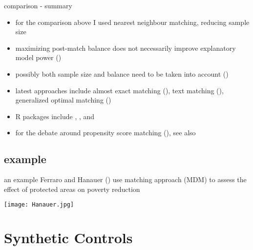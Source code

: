 \documentclass[aspectratio=169]{beamer}
\begin{document}
		\begin{frame}{comparison - summary}
			\begin{itemize}
				\item<1-> for the comparison above I used nearest neighbour matching, reducing sample size
				\item<2-> maximizing post-match balance does not necessarily improve explanatory model power (\cite{Colson2016})
				\item<3-> possibly both sample size and balance need to be taken into account (\cite{King2017})
				\item<4-> latest approaches include almost exact matching (\cite{Dieng2018,Dieng2021}), text matching (\cite{Roberts2020a}), generalized optimal matching (\cite{Kallus2020})
				\item<5-> R packages include \href{https://cran.r-project.org/web/packages/MatchIt/vignettes/MatchIt.html}{\underline{}}, \href{http://sekhon.berkeley.edu/matching/}{\underline{}}, and \href{https://github.com/insongkim/PanelMatch}{\underline{}}
				\item<6> for the debate around propensity score matching (\cite{King2019}), see also \href{https://p-hunermund.com/2019/02/06/why-so-much-hate-against-propensity-score-matching/amp/)}{\underline{}}
			\end{itemize}
		\end{frame}

	\subsection{example}
		\begin{frame}{an example}
			Ferraro and Hanauer (\citeyear{Ferraro2014}) use matching approach (MDM) to assess the effect of protected areas on poverty reduction
			\begin{center}
				\texttt{[image: Hanauer.jpg]}
			\end{center}
		\end{frame}

\section{Synthetic Controls}
\end{document}
